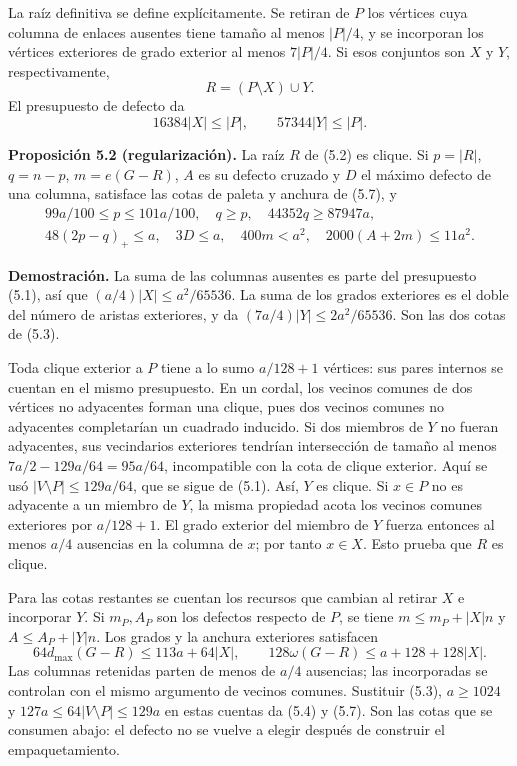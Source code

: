 \documentclass[spanish,11pt,a4paper]{article}
\begin{document}
La raíz definitiva se define explícitamente. Se retiran de \(P\) los vértices cuya columna de enlaces ausentes tiene tamaño al menos \(|P|/4\), y se incorporan los vértices exteriores de grado exterior al menos \(7|P|/4\). Si esos conjuntos son \(X\) y \(Y\), respectivamente, \[
R=(P\setminus X)\cup Y.
\tag{5.2}
\] El presupuesto de defecto da \[
16384|X|\le |P|,\qquad 57344|Y|\le |P|.
\tag{5.3}
\] 

\textbf{Proposición 5.2 (regularización).} La raíz \(R\) de (5.2) es clique. Si \(p=|R|\), \(q=n-p\), \(m=e(G-R)\), \(A\) es su defecto cruzado y \(D\) el máximo defecto de una columna, satisface las cotas de paleta y anchura de (5.7), y \[
\begin{gathered}
99a/100\le p\le101a/100,\quad q\ge p,\quad
44352q\ge87947a,\\
48(2p-q)_+\le a,\quad 3D\le a,\quad
400m<a^2,\quad2000(A+2m)\le11a^2.
\end{gathered}
\tag{5.4}
\]

\textbf{Demostración.} La suma de las columnas ausentes es parte del presupuesto (5.1), así que \((a/4)|X|\le a^2/65536\). La suma de los grados exteriores es el doble del número de aristas exteriores, y da \((7a/4)|Y|\le2a^2/65536\). Son las dos cotas de (5.3).

Toda clique exterior a \(P\) tiene a lo sumo \(a/128+1\) vértices: sus pares internos se cuentan en el mismo presupuesto. En un cordal, los vecinos comunes de dos vértices no adyacentes forman una clique, pues dos vecinos comunes no adyacentes completarían un cuadrado inducido. Si dos miembros de \(Y\) no fueran adyacentes, sus vecindarios exteriores tendrían intersección de tamaño al menos \(7a/2-129a/64=95a/64\), incompatible con la cota de clique exterior. Aquí se usó \(|V\setminus P|\le129a/64\), que se sigue de (5.1). Así, \(Y\) es clique. Si \(x\in P\) no es adyacente a un miembro de \(Y\), la misma propiedad acota los vecinos comunes exteriores por \(a/128+1\). El grado exterior del miembro de \(Y\) fuerza entonces al menos \(a/4\) ausencias en la columna de \(x\); por tanto \(x\in X\). Esto prueba que \(R\) es clique.

Para las cotas restantes se cuentan los recursos que cambian al retirar \(X\) e incorporar \(Y\). Si \(m_P,A_P\) son los defectos respecto de \(P\), se tiene \(m\le m_P+|X|n\) y \(A\le A_P+|Y|n\). Los grados y la anchura exteriores satisfacen \[
64d_{\max}(G-R)\le113a+64|X|,\qquad
128\omega(G-R)\le a+128+128|X|.
\] Las columnas retenidas parten de menos de \(a/4\) ausencias; las incorporadas se controlan con el mismo argumento de vecinos comunes. Sustituir (5.3), \(a\ge1024\) y \(127a\le64|V\setminus P|\le129a\) en estas cuentas da (5.4) y (5.7). Son las cotas que se consumen abajo: el defecto no se vuelve a elegir después de construir el empaquetamiento.
\end{document}
